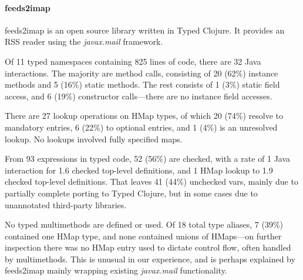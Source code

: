 \paragraph{feeds2imap}
feeds2imap is an open source library written in Typed Clojure. 
It provides an RSS reader using the \emph{javax.mail} framework.

Of 11 typed namespaces containing 825 lines of code, there are 32 Java interactions.
The majority are method calls, consisting of 20 (62\%) instance methods and 5 (16\%) static methods. 
The rest consists of 1 (3\%) static field access, and 6 (19\%) constructor calls---there are no instance field accesses.

There are 27 lookup operations on HMap types, of which 20 (74\%) resolve to mandatory entries, 6 (22\%) to optional entries, and 1 (4\%) is an unresolved lookup. 
No lookups involved fully specified maps.

From 93  expressions in typed code, 52 (56\%) are checked, with a rate of 1 Java interaction for 1.6 checked top-level definitions, and 1 HMap lookup to 1.9 checked top-level definitions.
That leaves 41 (44\%) unchecked vars, mainly due to partially complete porting to Typed Clojure, but in some cases due to unannotated third-party libraries.

No typed multimethods are defined or used. 
Of 18 total type aliases, 7 (39\%) contained one HMap type, and none contained unions of HMaps---on further inspection there was no HMap entry used to dictate control flow, often handled by multimethods.
This is unusual in our experience, and is perhaps explained by feeds2imap mainly wrapping existing \emph{javax.mail} functionality.


